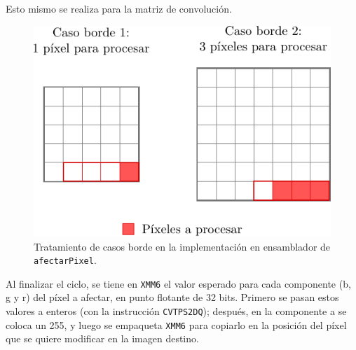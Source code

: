        Esto mismo se realiza para la matriz de convolución.
          
        \begin{figure}[h]
          \centering \includegraphics{imagenes/casos-borde-asm.pdf}
          \caption{Tratamiento de casos borde en la implementación en ensamblador de \texttt{afectarPixel}.} \label{fig:casos-borde-asm}
        \end{figure}

        Al finalizar el ciclo, se tiene en \texttt{XMM6} el valor esperado para cada componente (\textsf{b}, \textsf{g} y \textsf{r}) del píxel a afectar, en punto flotante de 32 bits. Primero se pasan estos valores a enteros (con la instrucción \texttt{CVTPS2DQ}); después, en la componente \textsf{a} se coloca un 255, y luego se empaqueta \texttt{XMM6} para copiarlo en la posición del píxel que se quiere modificar en la imagen destino.
